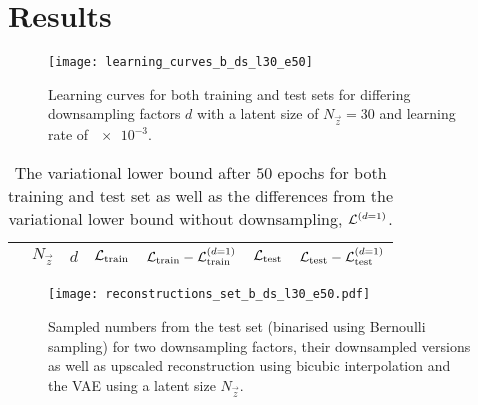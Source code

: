\section{Results}
\label{sec:results}

\begin{figure*}
	\centering
	\texttt{[image: learning\_curves\_b\_ds\_l30\_e50]}
	\caption{Learning curves for both training and test sets for differing downsampling factors $d$ with a latent size of $N_{\vec{z}} = 30$ and learning rate of $\num{e-3}$.}
	\label{fig:learning_curves}
\end{figure*}

\begin{table*}
	\centering
	\caption{
		The variational lower bound after $50$ epochs for both training and test set as well as the differences from the variational lower bound without downsampling, $\mathcal{L}^{(d = 1)}$.
	}
	\label{tab:variational_lower_bound}
	\setlength{\tabcolsep}{1em}
	\begin{tabular}{
			l@{}
			S[table-format = 2.0]
			S[table-format = 1.0]
			S[table-format = -3.2]
			S[table-format = -3.2]
			S[table-format = -2.2]
			S[table-format = -2.2]
		}
		\toprule
		& {$N_{\vec{z}}$} & {$d$} & {$\mathcal{L}_{\text{train}}$}
		& {$\mathcal{L}_{\text{train}} - \mathcal{L}_{\text{train}}^{(d = 1)}$}
		& {$\mathcal{L}_{\text{test}}$}
		& {$\mathcal{L}_{\text{test}} - \mathcal{L}_{\text{test}}^{(d = 1)}$} \\
		\midrule
		
		\bottomrule
	\end{tabular}
\end{table*}

\begin{figure*}
	\centering
	\texttt{[image: reconstructions\_set\_b\_ds\_l30\_e50.pdf]}
	\caption{
		Sampled numbers from the test set (binarised using Bernoulli sampling) for two downsampling factors,
		their downsampled versions as well as upscaled reconstruction using bicubic interpolation and the VAE using a latent size $N_{\vec{z}}$.
	}
	\label{fig:samples}
\end{figure*}

